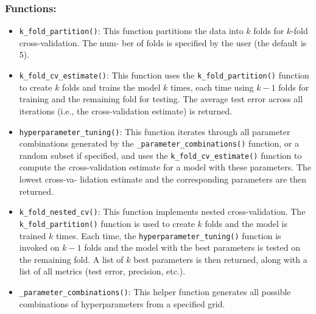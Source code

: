 \documentclass{article}
\begin{document}
\subsubsection*{Functions:}

\begin{itemize}
    
    \item \texttt{k\_fold\_partition()}:  
    This function partitions the data into \( k \) folds for \( k \)-fold cross-validation. The num- ber of folds is specified by the user (the default is 5).
    
    \item \texttt{k\_fold\_cv\_estimate()}:  
    This function uses the \texttt{k\_fold\_partition()} function to create \( k \) folds and trains the model \( k \) times, each time using \( k-1 \) folds for training and the remaining fold for testing. The average test error across all iterations (i.e., the cross-validation estimate) is returned.
    
    \item \texttt{hyperparameter\_tuning()}: 
        This function iterates through all parameter combinations generated by the \texttt{\_parameter\_combinations()} function, or a random subset if specified, and uses the \texttt{k\_fold\_cv\_estimate()} function to compute the cross-validation estimate for a model with these parameters. The lowest cross-va- lidation estimate and the corresponding parameters are then returned.
        
    \item \texttt{k\_fold\_nested\_cv()}: 
    This function implements nested cross-validation. The \texttt{k\_fold\_partition()} function is used to create \( k \) folds and the model is trained \( k \) times. Each time, the \texttt{hyperparameter\_tuning()} function is invoked on \( k-1 \) folds and the model with the best parameters is tested on the remaining fold. A list of \( k \) best parameters is then returned, along with a list of all metrics (test error, precision, etc.).

    \item \texttt{\_parameter\_combinations()}: 
    This helper function generates all possible combinations of hyperparameters from a specified grid.


\end{itemize}
\end{document}
